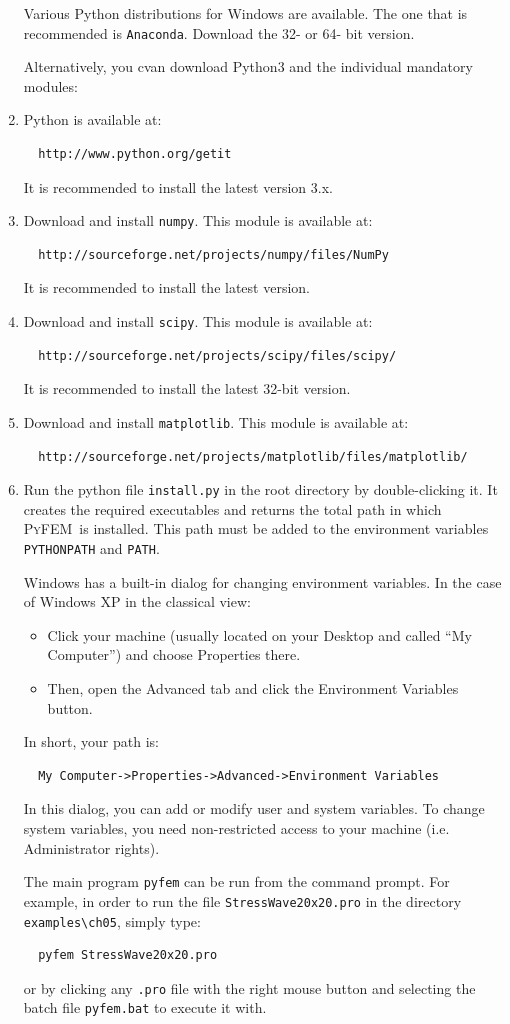 \documentclass{article}
\newcommand{\progname}{\textsc{PyFEM}}
\begin{document}
\begin{enumerate}
Various Python distributions for Windows are available. The one that is recommended is
\texttt{Anaconda}. Download the 32- or 64- bit version.

Alternatively, you cvan download Python3 and the individual mandatory modules:
\item Python is available at:
\begin{verbatim}
  http://www.python.org/getit
\end{verbatim} 
It is recommended to install the latest version 3.x.
\item Download and install \texttt{numpy}.
This module is available at:
\begin{verbatim}
  http://sourceforge.net/projects/numpy/files/NumPy
\end{verbatim}
It is recommended to install the latest version.
\item Download and install \texttt{scipy}.
This module is available at:
\begin{verbatim}
  http://sourceforge.net/projects/scipy/files/scipy/
\end{verbatim}
It is recommended to install the latest 32-bit version.
\item Download and install \texttt{matplotlib}.
This module is available at:
\begin{verbatim}
  http://sourceforge.net/projects/matplotlib/files/matplotlib/
\end{verbatim}
\item Run the python file \texttt{install.py} in the root directory 
by double-clicking it. It creates the required executables 
and returns the total path in which \progname~is installed. This path must be 
added to the environment variables \texttt{PYTHONPATH} and \texttt{PATH}. 

Windows has a built-in dialog for changing environment variables. In the case of Windows XP in
the classical view:
\begin{itemize} 
\item Click your machine (usually located on your Desktop 
and called “My Computer”) and choose Properties there. 
\item Then, open the Advanced tab and click the Environment 
Variables button.
\end{itemize} In short, your path is:
\begin{verbatim}
  My Computer->Properties->Advanced->Environment Variables
\end{verbatim}
In this dialog, you can add or modify user and system variables. 
To change system variables, you need non-restricted access to your machine (i.e. Administrator rights).

The main program \texttt{pyfem} can be run from the command prompt. For example, in order to run the
file \texttt{StressWave20x20.pro} in the directory \texttt{examples\textbackslash ch05}, simply type:
\begin{verbatim}
  pyfem StressWave20x20.pro
\end{verbatim}
or by clicking any \texttt{.pro} file with the right mouse button and selecting the batch file \texttt{pyfem.bat} 
to execute it with.
\end{enumerate}
\end{document}
